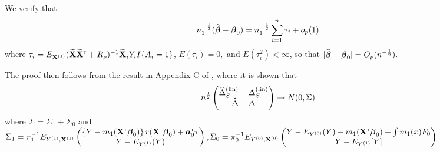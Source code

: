 \documentclass[useAMS,usenatbib,referee]{biom}
\begin{document}
We verify that \begin{align*}
    n_1^{-\frac{1}{2}}({\widehat{\boldsymbol{\beta}}} - \boldsymbol{\beta}_0) = n_1^{-\frac{1}{2}}\sum_{i=1}^n \tau_i + o_p(1)
\end{align*}
where $\tau_i = E_{{\bf X}^{(1)}}({\widetilde {{\bf X}}}{\widetilde {{\bf X}}}^{{\sf \scriptscriptstyle{T}}} + R_\rho)^{-1}{\widetilde {{\bf X}}}_i Y_iI\{A_i = 1\}$, $E(\tau_i) = 0,$ and $E(\tau_i^2) < \infty$, so that $|{\widehat{\boldsymbol{\beta}}} - \boldsymbol{\beta}_0| = O_p(n^{-\frac{1}{2}}).$

The proof then follows from the result in Appendix C of \cite{parast2016robust}, where it is shown that 
\begin{align*}
    n^{\frac{1}{2}}\left(
    \begin{matrix}
    {\widehat\Delta}_S^{(\text{lin})} - \Delta_S^{(\text{lin})}\\
    {\widehat\Delta} - \Delta
    \end{matrix}
    \right) \rightarrow N(0, \Sigma)
\end{align*}
where $\Sigma = \Sigma_1 + \Sigma_0$ and $\Sigma_1 = \pi_1\inv E_{Y\sone,\bX\sone}\left(
    \begin{matrix}
    \left\{Y - m_1(\bX\trans\bbeta_0)\right\}r(\bX\trans\bbeta_0) + \ba_0\trans\tau\\
    Y - E_{Y\sone}(Y)
    \end{matrix}
    \right),
    
    \Sigma_0 = \pi_0\inv E_{Y\szero,\bX\szero}\left(
    \begin{matrix}
    Y - E_{Y\szero}(Y) - m_1(\bX\trans\bbeta_0) + \int m_1(x)F_0\\
    Y - E_{Y\sone}[Y]
    \end{matrix}
    \right)
    $
\end{document}
